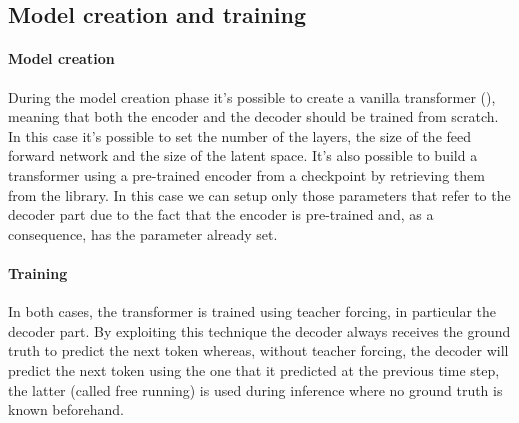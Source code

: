 \subsection{Model creation and training}

\paragraph{Model creation} During the model creation phase it's possible to create a vanilla transformer (\cite{vaswani2017attention}), meaning that both the encoder and the decoder should be trained from scratch. In this case it's possible to set the number of the layers, the size of the feed forward network and the size of the latent space. It's also possible to build a transformer using a pre-trained encoder from a checkpoint by retrieving them from the \cite{huggingface_co} library. In this case we can setup only those parameters that refer to the decoder part due to the fact that the encoder is pre-trained and, as a consequence, has the parameter already set.

\paragraph{Training}In both cases, the transformer is trained using teacher forcing, in particular the decoder part. By exploiting this technique the decoder always receives the ground truth to predict the next token whereas, without teacher forcing, the decoder will predict the next token using the one that it predicted at the previous time step, the latter (called free running) is used during inference where no ground truth is known beforehand.

